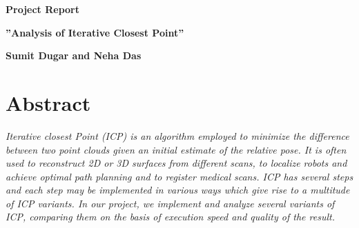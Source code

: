 \documentclass[a4paper,pagesize 10pt]{scrartcl}
\begin{document}
\begin{center}{\Huge\textbf{Project Report}}\end{center}
\begin{center}{\Large\textbf{''Analysis of Iterative Closest Point''}}\end{center}
\begin{center}{\small\textbf{Sumit Dugar and Neha Das}}\end{center}


\section*{Abstract}

\textit{Iterative closest Point (ICP) is an algorithm employed to minimize the difference between two point clouds given an initial estimate of the relative pose. It is often used to reconstruct 2D or 3D surfaces from different scans, to localize robots and achieve optimal path planning and to register medical scans. ICP has several steps and each step may be implemented in various ways which give rise to a multitude of ICP variants. In our project, we implement and analyze several variants of ICP, comparing them on the basis of execution speed and quality of the result.}
\end{document}
